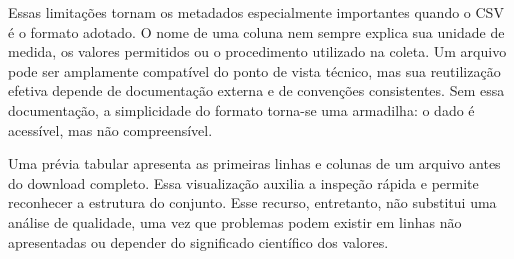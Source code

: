 Essas limitações tornam os metadados especialmente importantes quando o CSV é o formato adotado. O nome de uma coluna nem sempre explica sua unidade de medida, os valores permitidos ou o procedimento utilizado na coleta. Um arquivo pode ser amplamente compatível do ponto de vista técnico, mas sua reutilização efetiva depende de documentação externa e de convenções consistentes. Sem essa documentação, a simplicidade do formato torna-se uma armadilha: o dado é acessível, mas não compreensível.

Uma prévia tabular apresenta as primeiras linhas e colunas de um arquivo antes do download completo. Essa visualização auxilia a inspeção rápida e permite reconhecer a estrutura do conjunto. Esse recurso, entretanto, não substitui uma análise de qualidade, uma vez que problemas podem existir em linhas não apresentadas ou depender do significado científico dos valores.
